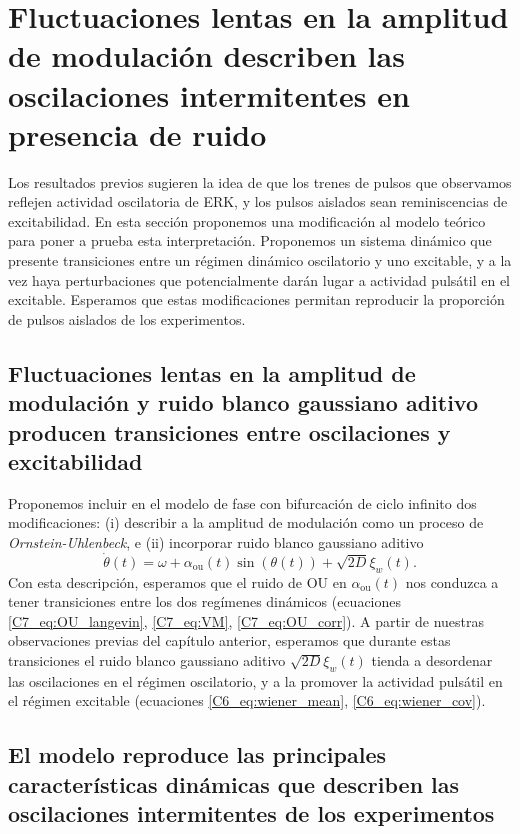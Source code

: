 \documentclass[./main.tex]{subfiles}
\begin{document}
\section{Fluctuaciones lentas en la amplitud de modulación describen las oscilaciones intermitentes en presencia de ruido}
\label{C7_sec:OUD}

Los resultados previos sugieren la idea de que los trenes de pulsos que observamos reflejen actividad oscilatoria de ERK, y los pulsos aislados sean reminiscencias de excitabilidad. En esta sección proponemos una modificación al modelo teórico para poner a prueba esta interpretación. Proponemos un sistema dinámico que presente transiciones entre un régimen dinámico oscilatorio y uno excitable, y a la vez haya perturbaciones que potencialmente darán lugar a actividad pulsátil en el excitable. Esperamos que estas modificaciones permitan reproducir la proporción de pulsos aislados de los experimentos. 


\subsection{Fluctuaciones lentas en la amplitud de modulación y ruido blanco gaussiano aditivo producen transiciones entre oscilaciones y excitabilidad}

Proponemos incluir en el modelo de fase con bifurcación de ciclo infinito dos modificaciones: (i) describir a la amplitud de modulación como un proceso de \textit{Ornstein-Uhlenbeck}, e (ii) incorporar ruido blanco gaussiano aditivo
\begin{equation}
    \dot{\theta}(t) = \omega + \alpha_{\text{ou}}(t) \sin{(\theta(t))} + \sqrt{2D} \xi_w(t).
    \label{C7_eq:alpha_ou_D}
\end{equation}
Con esta descripción, esperamos que el ruido de OU en $\alpha_{\text{ou}}(t)$ nos conduzca a tener transiciones entre los dos regímenes dinámicos (ecuaciones \ref{C7_eq:OU_langevin}, \ref{C7_eq:VM}, \ref{C7_eq:OU_corr}). A partir de nuestras observaciones previas del capítulo anterior, esperamos que durante estas transiciones el ruido blanco gaussiano aditivo $\sqrt{2D} \xi_w(t)$ tienda a desordenar las oscilaciones en el régimen oscilatorio, y a la promover la actividad pulsátil en el régimen excitable (ecuaciones \ref{C6_eq:wiener_mean}, \ref{C6_eq:wiener_cov}). 


\subsection{El modelo reproduce las principales características dinámicas que describen las oscilaciones intermitentes de los experimentos}
\end{document}
